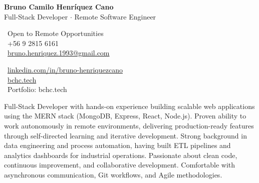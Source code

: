 \documentclass[10pt,letterpaper]{article}
\begin{document}
\begin{center}
    {\Huge \textbf{Bruno Camilo Henríquez Cano}} \\[0.2cm]
    {\Large Full-Stack Developer $\cdot$ Remote Software Engineer}
\end{center}

\vspace{0.3cm}

\noindent
\begin{minipage}[t]{0.5\textwidth}
    \faMapMarker\ Open to Remote Opportunities \\
    \faPhone\ +56 9 2815 6161 \\
    \faEnvelope\ \href{mailto:bruno.henriquez.1993@gmail.com}{bruno.henriquez.1993@gmail.com}
\end{minipage}
\begin{minipage}[t]{0.5\textwidth}
    \faLinkedin\ \href{https://linkedin.com/in/bruno-henriquezcano}{linkedin.com/in/bruno-henriquezcano} \\
    \faGlobe\ \href{https://bchc.tech}{bchc.tech} \\
    \faGlobe\ Portfolio: bchc.tech
\end{minipage}

\vspace{0.4cm}


\vspace{0.2cm}

\noindent Full-Stack Developer with hands-on experience building scalable web applications using the MERN stack (MongoDB, Express, React, Node.js). Proven ability to work autonomously in remote environments, delivering production-ready features through self-directed learning and iterative development. Strong background in data engineering and process automation, having built ETL pipelines and analytics dashboards for industrial operations. Passionate about clean code, continuous improvement, and collaborative development. Comfortable with asynchronous communication, Git workflows, and Agile methodologies.

\vspace{0.4cm}


\vspace{0.3cm}
\end{document}
